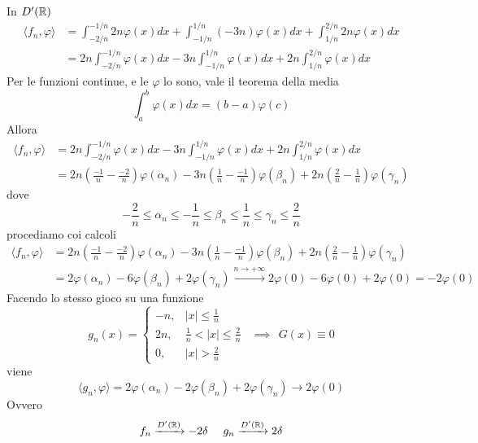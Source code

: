 In $D'(\mathbb{R})$
\begin{equation*}
\begin{aligned}
\langle f_{n}, \varphi \rangle & = \int^{- 1/n}_{- 2/n} 2n\varphi (x) dx + \int^{1/n}_{- 1/n}(- 3n) \varphi (x) dx + \int^{2/n}_{1/n} 2n\varphi (x) dx\\
 & = 2n\int^{- 1/n}_{- 2/n} \varphi (x) dx - 3n\int^{1/n}_{- 1/n} \varphi (x) dx + 2n\int^{2/n}_{1/n} \varphi (x) dx
\end{aligned}
\end{equation*}
Per le funzioni continue, e le $\varphi $ lo sono, vale il teorema della media
\begin{equation*}
\int^{b}_{a} \varphi (x) dx = (b - a) \varphi (c)
\end{equation*}
Allora
\begin{equation*}
\begin{aligned}
\langle f_{n}, \varphi \rangle & = 2n\int^{- 1/n}_{- 2/n} \varphi (x) dx - 3n\int^{1/n}_{- 1/n} \varphi (x) dx + 2n\int^{2/n}_{1/n} \varphi (x) dx\\
 & = 2n\left(\frac{- 1}{n} - \frac{- 2}{n}\right) \varphi (\alpha_{n}) - 3n\left(\frac{1}{n} - \frac{- 1}{n}\right) \varphi (\beta_{n}) + 2n\left(\frac{2}{n} - \frac{1}{n}\right) \varphi (\gamma_{n})
\end{aligned}
\end{equation*}
dove
\begin{equation*}
- \frac{2}{n} \leq \alpha_{n} \leq - \frac{1}{n} \leq \beta_{n} \leq \frac{1}{n} \leq \gamma_{n} \leq \frac{2}{n}
\end{equation*}
procediamo coi calcoli
\begin{equation*}
\begin{aligned}
\langle f_{n}, \varphi \rangle & = 2n\left(\frac{- 1}{n} - \frac{- 2}{n}\right) \varphi (\alpha_{n}) - 3n\left(\frac{1}{n} - \frac{- 1}{n}\right) \varphi (\beta_{n}) + 2n\left(\frac{2}{n} - \frac{1}{n}\right) \varphi (\gamma_{n})\\
 & = 2\varphi (\alpha_{n}) - 6\varphi (\beta_{n}) + 2\varphi (\gamma_{n})\xrightarrow{n\rightarrow + \infty} 2\varphi (0) - 6\varphi (0) + 2\varphi (0) = - 2\varphi (0)
\end{aligned}
\end{equation*}
Facendo lo stesso gioco su una funzione
\begin{equation*}
g_{n} (x) =
\begin{cases}
- n, & |x| \leq \frac{1}{n}\\
2n, & \frac{1}{n} < |x| \leq \frac{2}{n}\\
0, & |x| > \frac{2}{n}
\end{cases} \ \ \implies \ \ G(x) \equiv 0
\end{equation*}
viene
\begin{equation*}
\langle g_{n}, \varphi \rangle = 2\varphi (\alpha_{n}) - 2\varphi (\beta_{n}) + 2\varphi (\gamma_{n})\rightarrow 2\varphi (0)
\end{equation*}
Ovvero
\begin{equation*}
f_{n}\xrightarrow{D'(\mathbb{R})} - 2\delta \ \ \ \ g_{n}\xrightarrow{D'(\mathbb{R})} 2\delta
\end{equation*}
\Soluzione

